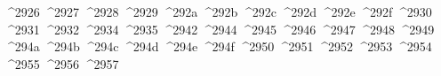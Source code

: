 {  ^^^^2926%
  ^^^^2927%
  ^^^^2928%
  ^^^^2929%
  ^^^^292a%
  ^^^^292b%
  ^^^^292c%
  ^^^^292d%
  ^^^^292e%
  ^^^^292f%
  ^^^^2930%
  ^^^^2931%
  ^^^^2932%
  ^^^^2934%
  ^^^^2935%
  ^^^^2942%
  ^^^^2944%
  ^^^^2945%
  ^^^^2946%
  ^^^^2947%
  ^^^^2948%
  ^^^^2949%
  ^^^^294a%
  ^^^^294b%
  ^^^^294c%
  ^^^^294d%
  ^^^^294e%
  ^^^^294f%
  ^^^^2950%
  ^^^^2951%
  ^^^^2952%
  ^^^^2953%
  ^^^^2954%
  ^^^^2955%
  ^^^^2956%
  ^^^^2957%
}
